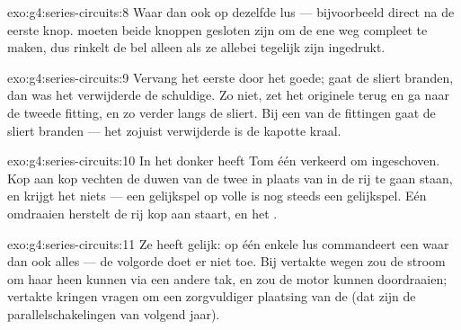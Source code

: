 \begin{solution}{exo:g4:series-circuits:8}
Waar dan ook op dezelfde lus --- bijvoorbeeld direct na de eerste
knop.  moeten beide knoppen gesloten zijn om de ene weg
compleet te maken, dus rinkelt de bel alleen als ze allebei tegelijk
zijn ingedrukt.
\end{solution}

\begin{solution}{exo:g4:series-circuits:9}
Vervang het eerste  door het goede; gaat de sliert
branden, dan was het verwijderde  de schuldige. Zo niet, zet
het originele terug en ga naar de tweede fitting, en zo verder langs
de sliert. Bij een van de fittingen gaat de sliert branden --- het
zojuist verwijderde  is de kapotte kraal.
\end{solution}

\begin{solution}{exo:g4:series-circuits:10}
In het donker heeft Tom één  verkeerd om ingeschoven. Kop aan
kop vechten de duwen van de twee  in plaats van in de rij te
gaan staan, en krijgt het  niets --- een gelijkspel op volle
 is nog steeds een gelijkspel. Eén  omdraaien herstelt de
rij kop aan staart, en het .
\end{solution}

\begin{solution}{exo:g4:series-circuits:11}
Ze heeft gelijk: op één enkele lus commandeert een  waar
dan ook alles --- de volgorde doet er niet toe. Bij vertakte wegen zou
de stroom om haar  heen kunnen via een andere tak, en zou de
motor kunnen doordraaien; vertakte kringen vragen om een zorgvuldiger
plaatsing van de  (dat zijn de parallelschakelingen van
volgend jaar).
\end{solution}
